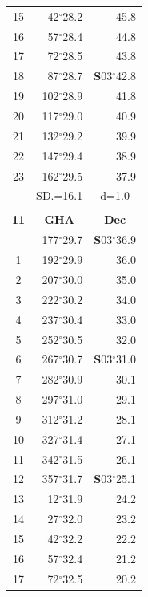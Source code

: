 \documentclass[10pt, a4paper]{report}
\begin{document}
\begin{scriptsize}
\begin{tabular*}{0.2\textwidth}[t]{@{\extracolsep{\fill}}|c|rr|}
15 & 42$^\circ$28.2 & \raisebox{0.24ex}{\boldmath$\cdot$~\boldmath$\cdot$~~}45.8\\
16 & 57$^\circ$28.4 & 44.8\\
17 & 72$^\circ$28.5 & 43.8\\[2Pt]
18 & 87$^\circ$28.7 & \textbf{S}03$^\circ$42.8\\
19 & 102$^\circ$28.9 & 41.8\\
20 & 117$^\circ$29.0 & 40.9\\
21 & 132$^\circ$29.2 & \raisebox{0.24ex}{\boldmath$\cdot$~\boldmath$\cdot$~~}39.9\\
22 & 147$^\circ$29.4 & 38.9\\
23 & 162$^\circ$29.5 & 37.9\\
\hline
\rule{0pt}{2.4ex} & \multicolumn{1}{c}{SD.=16.1} & \multicolumn{1}{c|}{d=1.0}\\
\hline
\multicolumn{1}{c}{}\\[-0.5ex]\hline
\multicolumn{1}{|c|}{\rule{0pt}{2.6ex}\textbf{11}} & \multicolumn{1}{c}{\textbf{GHA}} & \multicolumn{1}{c|}{\textbf{Dec}}\\
\hline\rule{0pt}{2.6ex}\noindent
0 & 177$^\circ$29.7 & \textbf{S}03$^\circ$36.9\\
1 & 192$^\circ$29.9 & 36.0\\
2 & 207$^\circ$30.0 & 35.0\\
3 & 222$^\circ$30.2 & \raisebox{0.24ex}{\boldmath$\cdot$~\boldmath$\cdot$~~}34.0\\
4 & 237$^\circ$30.4 & 33.0\\
5 & 252$^\circ$30.5 & 32.0\\[2Pt]
6 & 267$^\circ$30.7 & \textbf{S}03$^\circ$31.0\\
7 & 282$^\circ$30.9 & 30.1\\
8 & 297$^\circ$31.0 & 29.1\\
9 & 312$^\circ$31.2 & \raisebox{0.24ex}{\boldmath$\cdot$~\boldmath$\cdot$~~}28.1\\
10 & 327$^\circ$31.4 & 27.1\\
11 & 342$^\circ$31.5 & 26.1\\[2Pt]
12 & 357$^\circ$31.7 & \textbf{S}03$^\circ$25.1\\
13 & 12$^\circ$31.9 & 24.2\\
14 & 27$^\circ$32.0 & 23.2\\
15 & 42$^\circ$32.2 & \raisebox{0.24ex}{\boldmath$\cdot$~\boldmath$\cdot$~~}22.2\\
16 & 57$^\circ$32.4 & 21.2\\
17 & 72$^\circ$32.5 & 20.2\\[2Pt]

\end{tabular*}
\end{scriptsize}
\end{document}
